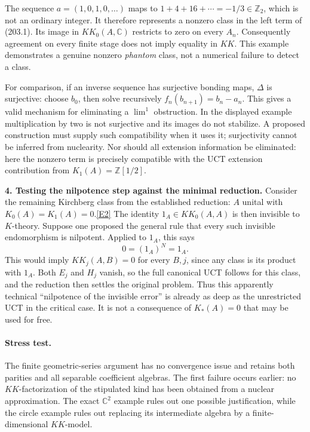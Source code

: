 \documentclass[11pt,a4paper]{article}
\newcommand{\Z}{\mathbb{Z}}
\newcommand{\C}{\mathbb{C}}
\newcommand{\eref}[2]{\hyperlink{extra:#1:#2}{[E#2]}}
\begin{document}
The sequence $a=(1,0,1,0,\ldots)$ maps to
$1+4+16+\cdots=-1/3\in\Z_2$, which is not an ordinary integer. It
therefore represents a nonzero class in the left term of (203.1).
Its image in $KK_0(A,\C)$ restricts to zero on every $A_n$.
Consequently agreement on every finite stage does not imply equality in
$KK$. This example demonstrates a genuine nonzero \emph{phantom} class,
not a numerical failure to detect a class.

For comparison, if an inverse sequence has surjective bonding maps,
$\Delta$ is surjective: choose $b_0$, then solve recursively
$f_n(b_{n+1})=b_n-a_n$. This gives a valid mechanism for eliminating a
$\lim^1$ obstruction. In the displayed example multiplication by two is
not surjective and its images do not stabilize. A proposed construction
must supply such compatibility when it uses it; surjectivity cannot be
inferred from nuclearity. Nor should all extension information be
eliminated: here the nonzero term is precisely compatible with the UCT
extension contribution from $K_1(A)=\Z[1/2]$.

\textbf{4. Testing the nilpotence step against the minimal reduction.}
Consider the remaining Kirchberg class from the established reduction:
$A$ unital with $K_0(A)=K_1(A)=0$.\eref{203}{2}
The identity $1_A\in KK_0(A,A)$ is then invisible to $K$-theory. Suppose
one proposed the general rule that every such invisible endomorphism is
nilpotent. Applied to $1_A$, this says
\[
 0=(1_A)^N=1_A.
\]
This would imply $KK_j(A,B)=0$ for every $B,j$, since any class is its
product with $1_A$. Both $E_j$ and $H_j$ vanish, so the full canonical
UCT follows for this class, and the reduction then settles the original
problem. Thus this apparently technical ``nilpotence of the invisible
error'' is already as deep as the unrestricted UCT in the critical case.
It is not a consequence of $K_*(A)=0$ that may be used for free.

\paragraph{Stress test.}
The finite geometric-series argument has no convergence issue and retains
both parities and all separable coefficient algebras. The first failure
occurs earlier: no $KK$-factorization of the stipulated kind has been
obtained from a nuclear approximation. The exact $\C^2$ example rules out
one possible justification, while the circle example rules out replacing
its intermediate algebra by a finite-dimensional $KK$-model.
\end{document}
